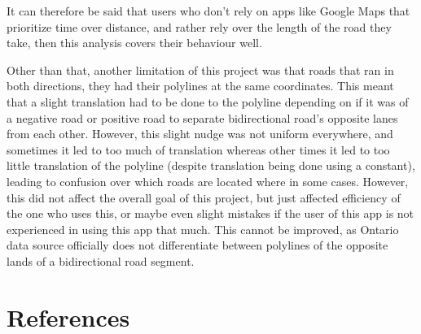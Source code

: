 \documentclass[fontsize=11pt]{article}
\begin{document}
It can therefore be said that users who don't rely on apps like Google Maps that prioritize time over distance, and rather rely over the length of the road they take, then this analysis covers their behaviour well. 

Other than that, another limitation of this project was that roads that ran in both directions, they had their polylines at the same coordinates. This meant that a slight translation had to be done to the polyline depending on if it was of a negative road or positive road to separate bidirectional road's opposite lanes from each other. However, this slight nudge was not uniform everywhere, and sometimes it led to too much of translation whereas other times it led to too little translation of the polyline (despite translation being done using a constant), leading to confusion over which roads are located where in some cases. However, this did not affect the overall goal of this project, but just affected efficiency of the one who uses this, or maybe even slight mistakes if the user of this app is not experienced in using this app that much. This cannot be improved, as Ontario data source officially does not differentiate between polylines of the opposite lands of a bidirectional road segment.  

\section*{References}
\end{document}
